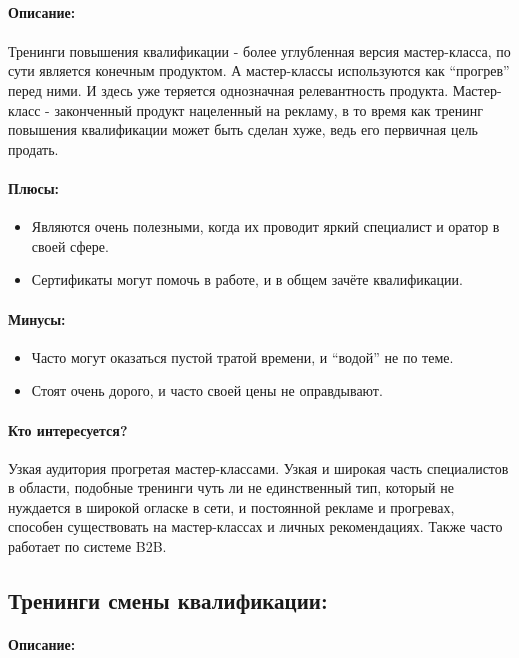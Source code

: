 \documentclass{article}
\begin{document}
\paragraph{\textbf{Описание:}}
\paragraph{}
Тренинги повышения квалификации - более углубленная версия мастер-класса, по сути является конечным продуктом. А мастер-классы используются как “прогрев” перед ними. И здесь уже теряется однозначная релевантность продукта. Мастер-класс - законченный продукт нацеленный на рекламу, в то время как тренинг повышения квалификации может быть сделан хуже, ведь его первичная цель продать. 
\paragraph{\textbf{Плюсы:}}
\begin{itemize}
    \item Являются очень полезными, когда их проводит яркий специалист и оратор в своей сфере.
    \item Сертификаты могут помочь в работе, и в общем зачёте квалификации.
\end{itemize}
\paragraph{\textbf{Минусы:}}
\begin{itemize}
    \item Часто могут оказаться пустой тратой времени, и “водой” не по теме.
    \item Стоят очень дорого, и часто своей цены не оправдывают.
\end{itemize}
\paragraph{\textbf{Кто интересуется?}}
Узкая аудитория прогретая мастер-классами. Узкая и широкая часть специалистов в области, подобные тренинги чуть ли не единственный тип, который не нуждается в широкой огласке в сети, и постоянной рекламе и прогревах, способен существовать на мастер-классах и личных рекомендациях. Также часто работает по системе B2B.

\subsection{Тренинги смены квалификации:}
\paragraph{\textbf{Описание:}}
\end{document}
